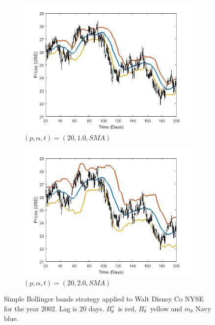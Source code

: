 \documentclass[11pt,a4,twosided,singlespacing,titlepagenumber=on]{scrreprt}
\numberwithin{equation}{chapter} %
\theoremstyle{remark}
\begin{document}
\begin{figure}[H]
    \centering
    \begin{subfigure}[t]{0.49\textwidth}
        \centering
        \includegraphics[width=1\textwidth]{bollinger/1}
        \caption{$(p, \alpha, t) = (20,1.0, SMA)$}
        \label{bollinger1}
    \end{subfigure}
    \begin{subfigure}[t]{0.49\textwidth}
        \centering
        \includegraphics[width=1\textwidth]{bollinger/2}
        \caption{$(p, \alpha, t) = (20,2.0, SMA)$}
        \label{bollinger2}
    \end{subfigure}
    \caption{Simple Bollinger bands strategy applied to Walt Disney Co NYSE for the year 2002. Lag is 20 days. $B^+_\theta$ is red, $B^-_\theta$ yellow and $m_\theta$ Navy blue.}
    \label{bollinger_bands_intro}
\end{figure}
\end{document}
